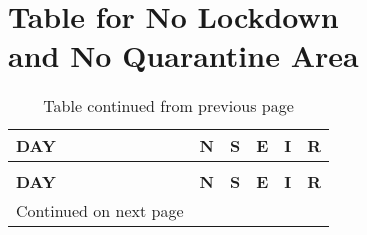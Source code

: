 \chapter{Table for No Lockdown \\ and No Quarantine Area}


\begin{longtable}{|l|l|l|l|l|l|}
	\caption{No Lockdown and No Quarantine Area} \\
	
	\toprule
	\textbf{DAY} & \textbf{N} & \textbf{S} & \textbf{E }& \textbf{I} &\textbf{ R} \\
	\midrule
	\endfirsthead
	\caption*{Table continued from previous page} \\
	\toprule
	\textbf{DAY} & \textbf{N} & \textbf{S} & \textbf{E }& \textbf{I} &\textbf{ R} \\
	\midrule
	\endhead
	\midrule
	\multicolumn{1}{r}{\footnotesize Continued on next page}
	\endfoot
	\bottomrule
	\endlastfoot
	

\end{longtable}
